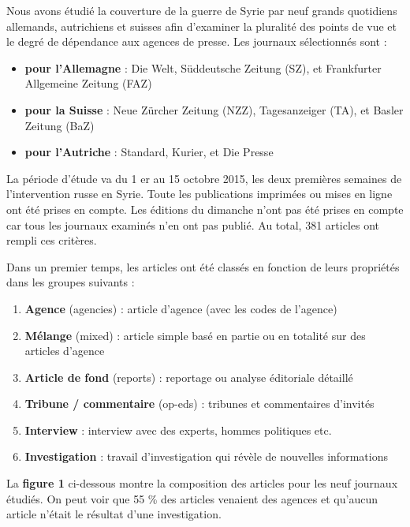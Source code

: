 Nous avons étudié la couverture de la guerre de Syrie par neuf grands
quotidiens allemands, autrichiens et suisses afin d'examiner la
pluralité des points de vue et le degré de dépendance aux agences de
presse. Les journaux sélectionnés sont :

\begin{itemize}
\tightlist
\item
  \textbf{pour l'Allemagne} : Die Welt, Süddeutsche Zeitung (SZ), et
  Frankfurter Allgemeine Zeitung (FAZ)
\item
  \textbf{pour la Suisse} : Neue Zürcher Zeitung (NZZ), Tagesanzeiger
  (TA), et Basler Zeitung (BaZ)
\item
  \textbf{pour l'Autriche} : Standard, Kurier, et Die Presse
\end{itemize}

La période d'étude va du 1 er au 15 octobre 2015, les deux premières
semaines de l'intervention russe en Syrie. Toute les publications
imprimées ou mises en ligne ont été prises en compte. Les éditions du
dimanche n'ont pas été prises en compte car tous les journaux examinés
n'en ont pas publié. Au total, 381 articles ont rempli ces critères.

Dans un premier temps, les articles ont été classés en fonction de leurs
propriétés dans les groupes suivants :

\begin{enumerate}
\def\labelenumi{\arabic{enumi}.}
\tightlist
\item
  \textbf{Agence} (agencies) : article d'agence (avec les codes de
  l'agence)
\item
  \textbf{Mélange} (mixed) : article simple basé en partie ou en
  totalité sur des articles d'agence
\item
  \textbf{Article de fond} (reports) : reportage ou analyse éditoriale
  détaillé
\item
  \textbf{Tribune / commentaire} (op-eds) : tribunes et commentaires
  d'invités
\item
  \textbf{Interview} : interview avec des experts, hommes politiques
  etc.
\item
  \textbf{Investigation} : travail d'investigation qui révèle de
  nouvelles informations
\end{enumerate}

La \textbf{figure 1} ci-dessous montre la composition des articles pour
les neuf journaux étudiés. On peut voir que 55 \% des articles venaient
des agences et qu'aucun article n'était le résultat d'une investigation.

